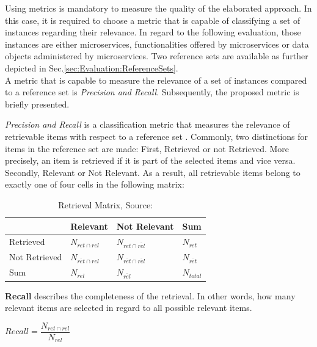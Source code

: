 Using metrics is mandatory to measure the quality of the elaborated approach. In this case, it is required to choose a metric that is capable of classifying a set of instances regarding their relevance.
In regard to the following evaluation, those instances are either microservices, functionalities offered by microservices or data objects administered by microservices. Two reference sets are available as further depicted in Sec.\ref{sec:Evaluation:ReferenceSets}. \\
A metric that is capable to measure the relevance of a set of instances compared to a reference set is \textit{Precision and Recall}. Subsequently, the proposed metric is briefly presented.

\noindent
\textit{Precision and Recall} is a classification metric that measures the relevance of retrievable items with respect to a reference set \cite{PrecisionRecall}. Commonly, two distinctions for items in the reference set are made: First, Retrieved or not Retrieved. More precisely, an item is retrieved if it is part of the selected items and vice versa. Secondly, Relevant or Not Relevant. As a result, all retrievable items belong to exactly one of four cells in the following matrix:


\begin{table}[!h]
	\centering
	\begin{tabular}{|l||l|l|l|}
		\hline
		& Relevant & Not Relevant & Sum \\ \hline
		Retrieved     &     $N_{ret\cap rel}$     &     $N_{ret\cap \overline{rel}}$            &     $N_{ret}$  \\ \hline
		Not Retrieved &      $N_{\overline{ret}\cap rel}$      &      $N_{\overline{ret}\cap \overline{rel}}$          &    $N_{\overline{ret}}$   \\\hline
		Sum           &         $N_{rel}$   &      $N_{\overline{rel}}$          &    $N_{total}$   \\ \hline
		
	\end{tabular}
\caption{Retrieval Matrix, Source: \cite{PrecisionRecall}}
    \label{tab:PrecRecall}
    
\end{table}



\noindent
\textbf{Recall} describes the completeness of the retrieval. In other words, how many relevant items are selected in regard to all possible relevant items.

\begin{centering}
	\vspace{1cm}
	
	$Recall=\dfrac{N_{ret\cap rel}}{ N_{rel} }  $
	
	\vspace{1cm}
\end{centering} 

